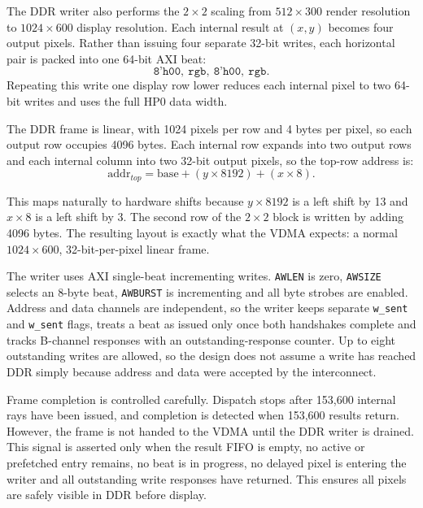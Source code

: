 The DDR writer also performs the $2 \times 2$ scaling from $512 \times 300$ render resolution to $1024 \times 600$ display resolution. Each internal result at $(x,y)$ becomes four output pixels. Rather than issuing four separate 32-bit writes, each horizontal pair is packed into one 64-bit AXI beat:
\begin{equation}
{\texttt{8'h00},\ \texttt{rgb},\ \texttt{8'h00},\ \texttt{rgb}}.
\end{equation}
Repeating this write one display row lower reduces each internal pixel to two 64-bit writes and uses the full HP0 data width.

The DDR frame is linear, with 1024 pixels per row and 4 bytes per pixel, so each output row occupies 4096 bytes. Each internal row expands into two output rows and each internal column into two 32-bit output pixels, so the top-row address is:
\begin{equation}
\mathrm{addr}_{top}=\mathrm{base}+(y \times 8192)+(x \times 8).
\end{equation}

This maps naturally to hardware shifts because $y \times 8192$ is a left shift by 13 and $x \times 8$ is a left shift by 3. The second row of the $2 \times 2$ block is written by adding 4096 bytes. The resulting layout is exactly what the VDMA expects: a normal $1024 \times 600$, 32-bit-per-pixel linear frame.

The writer uses AXI single-beat incrementing writes. \texttt{AWLEN} is zero, \texttt{AWSIZE} selects an 8-byte beat, \texttt{AWBURST} is incrementing and all byte strobes are enabled. Address and data channels are independent, so the writer keeps separate \texttt{w\_sent} and \texttt{w\_sent} flags, treats a beat as issued only once both handshakes complete and tracks B-channel responses with an outstanding-response counter. Up to eight outstanding writes are allowed, so the design does not assume a write has reached DDR simply because address and data were accepted by the interconnect.

Frame completion is controlled carefully. Dispatch stops after 153,600 internal rays have been issued, and completion is detected when 153,600 results return. However, the frame is not handed to the VDMA until the DDR writer is drained. This signal is asserted only when the result FIFO is empty, no active or prefetched entry remains, no beat is in progress, no delayed pixel is entering the writer and all outstanding write responses have returned. This ensures all pixels are safely visible in DDR before display.

